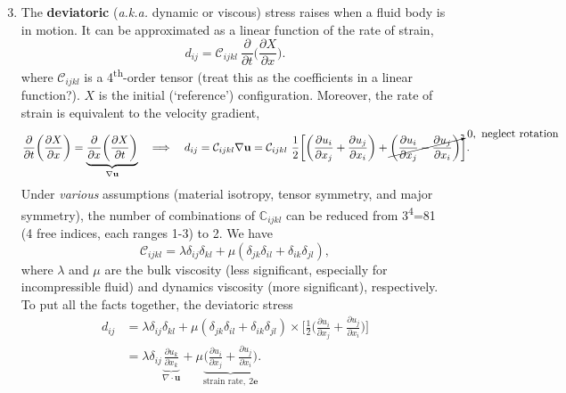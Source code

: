 \documentclass[a4paper]{article}
\begin{document}
\begin{enumerate}\setcounter{enumi}{2}
    \item The \textbf{deviatoric} (\textit{a.k.a.} dynamic or viscous) stress raises when a fluid body is in motion. It can be approximated as a linear function of the rate of strain,
    \[
        d_{ij} = \mathcal{C}_{ijkl} \ \frac{\partial}{\partial t} \bigg( \frac{\partial X}{\partial x} \bigg).
    \]
    where $\mathcal{C}_{ijkl}$ is a 4\textsuperscript{th}-order tensor {\color{gray}(treat this as the coefficients in a linear function?)}. $X$ is the initial (`reference') configuration. Moreover, the rate of strain is equivalent to the velocity gradient,
    \[
        \frac{\partial}{\partial t} \bigg( \frac{\partial X}{\partial x} \bigg) = \underbrace{\frac{\partial}{\partial x} \bigg( \frac{\partial X}{\partial t} \bigg)}_{\nabla \mathbf{u}} 
        \quad \Longrightarrow \quad 
        d_{ij} = \mathcal{C}_{ijkl} \nabla \mathbf{u} = \mathcal{C}_{ijkl} \ \frac{1}{2} \bigg[ \bigg(\frac{\partial u_{i}}{\partial x_{j}} + \frac{\partial u_{j}}{\partial x_{i}}\bigg) + \cancelto{0,\ \text{neglect rotation}}{\bigg(\frac{\partial u_{i}}{\partial x_{j}} - \frac{\partial u_{j}}{\partial x_{i}}\bigg)} \bigg].
    \]
    Under \textit{various} assumptions (material isotropy, tensor symmetry, and major symmetry), the number of combinations of $\mathbb{C}_{ijkl}$ can be reduced from 3\textsuperscript{4}=81 {\color{gray}(4 free indices, each ranges 1-3)} to 2. We have
    \[
        \mathcal{C}_{ijkl} = \lambda \delta_{ij} \delta_{kl} + \mu (\delta_{jk} \delta_{il} + \delta_{ik} \delta_{jl} ),
    \]
    where $\lambda$ and $\mu$ are the bulk viscosity {\color{gray}(less significant, especially for incompressible fluid)} and dynamics viscosity {\color{gray}(more significant)}, respectively. To put all the facts together, the deviatoric stress
    \begin{align*}
        d_{ij}
        & = \lambda \delta_{ij} \delta_{kl} + \mu (\delta_{jk} \delta_{il} + \delta_{ik} \delta_{jl} ) \times \bigg[ \frac{1}{2} \bigg(\frac{\partial u_{i}}{\partial x_{j}} + \frac{\partial u_{j}}{\partial x_{i}}\bigg) \bigg] \\
        & = \lambda \delta_{ij} \underbrace{\frac{\partial u_{k}}{\partial x_{k}}}_{\nabla \cdot \mathbf{u}} + \mu \underbrace{\bigg(\frac{\partial u_{i}}{\partial x_{j}} + \frac{\partial u_{j}}{\partial x_{i}}\bigg)}_{\text{strain rate}, \ 2\mathbf{e}}.
    \end{align*}
\end{enumerate}
\end{document}
